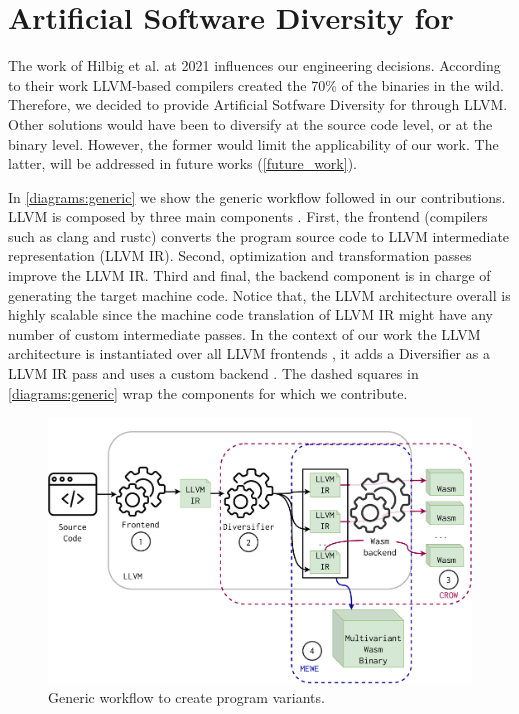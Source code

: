 \section{Artificial Software Diversity for \wasm}
\label{tech:generic}

The work of Hilbig et al. \cite{Hilbig2021AnES} at 2021 influences our engineering decisions. According to their work LLVM-based compilers created the 70\% of the \wasm binaries in the wild. Therefore, we decided to provide Artificial Sotfware Diversity for \wasm through LLVM. 
Other solutions would have been to diversify at the source code level, or at the \wasm binary level. However, the former would limit the applicability of our work. The latter, will be addressed in future works (\autoref{future_work}).

In \autoref{diagrams:generic} we show the generic workflow followed in our contributions. LLVM is composed by three main components \citationneeded. First, the frontend (compilers such as clang and rustc) converts the program source code to LLVM intermediate representation (LLVM IR). Second, optimization and transformation passes improve the LLVM IR. Third and final, the backend component is in charge of generating the target machine code. Notice that, the LLVM architecture overall is highly scalable since the machine code translation of LLVM IR might have any number of custom intermediate passes. 
In the context of our work the LLVM architecture is instantiated over all LLVM frontends , it adds a Diversifier as a LLVM IR pass  and uses a custom backend .
The dashed squares in \autoref{diagrams:generic} wrap the components for which we contribute.

\begin{figure}[h]
    \includegraphics[width=\linewidth]{diagrams/architecture.pdf}
    \caption{Generic workflow to create \wasm program variants.}
    \label{diagrams:generic}
\end{figure}


